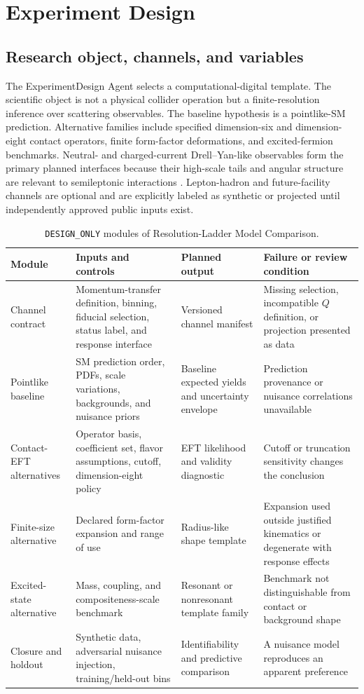 \section{Experiment Design}

\subsection{Research object, channels, and variables}

The ExperimentDesign Agent selects a computational-digital template. The scientific object is not a physical collider operation but a finite-resolution inference over scattering observables. The baseline hypothesis is a pointlike-SM prediction. Alternative families include specified dimension-six and dimension-eight contact operators, finite form-factor deformations, and excited-fermion benchmarks. Neutral- and charged-current Drell--Yan-like observables form the primary planned interfaces because their high-scale tails and angular structure are relevant to semileptonic interactions \cite{allwicher2023}. Lepton-hadron and future-facility channels are optional and are explicitly labeled as synthetic or projected until independently approved public inputs exist.

\begin{table}[!t]
\caption{\texttt{DESIGN\_ONLY} modules of Resolution-Ladder Model Comparison.}
\label{tab:modules}
\centering
\footnotesize
\begin{tabularx}{\textwidth}{p{}p{}Y Y}
\toprule
\textbf{Module} & \textbf{Inputs and controls} & \textbf{Planned output} & \textbf{Failure or review condition}\\
\midrule
Channel contract & Momentum-transfer definition, binning, fiducial selection, status label, and response interface & Versioned channel manifest & Missing selection, incompatible $Q$ definition, or projection presented as data\\
Pointlike baseline & SM prediction order, PDFs, scale variations, backgrounds, and nuisance priors & Baseline expected yields and uncertainty envelope & Prediction provenance or nuisance correlations unavailable\\
Contact-EFT alternatives & Operator basis, coefficient set, flavor assumptions, cutoff, dimension-eight policy & EFT likelihood and validity diagnostic & Cutoff or truncation sensitivity changes the conclusion\\
Finite-size alternative & Declared form-factor expansion and range of use & Radius-like shape template & Expansion used outside justified kinematics or degenerate with response effects\\
Excited-state alternative & Mass, coupling, and compositeness-scale benchmark & Resonant or nonresonant template family & Benchmark not distinguishable from contact or background shape\\
Closure and holdout & Synthetic data, adversarial nuisance injection, training/held-out bins & Identifiability and predictive comparison & A nuisance model reproduces an apparent preference\\
\bottomrule
\end{tabularx}
\end{table}

